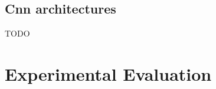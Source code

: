 \documentclass[runningheads]{llncs}
\begin{document}


\subsection{Cnn architectures}

TODO

\section{Experimental Evaluation}
\end{document}
